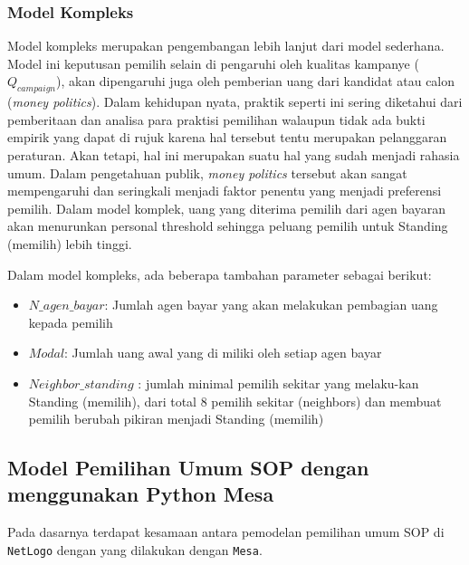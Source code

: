\subsubsection{Model Kompleks}

Model kompleks merupakan pengembangan lebih lanjut dari model sederhana. Model ini keputusan pemilih selain di pengaruhi oleh kualitas kampanye ($Q_{campaign}$), akan dipengaruhi juga oleh pemberian uang dari kandidat atau calon (\textit{money politics}). Dalam kehidupan nyata, praktik seperti ini sering diketahui dari pemberitaan dan analisa para praktisi pemilihan walaupun tidak ada bukti empirik yang dapat di rujuk karena hal tersebut tentu merupakan pelanggaran peraturan. Akan tetapi, hal ini merupakan suatu hal yang sudah menjadi rahasia umum. Dalam pengetahuan publik, \textit{money politics} tersebut akan sangat mempengaruhi dan seringkali menjadi faktor penentu yang menjadi preferensi pemilih. Dalam model komplek, uang yang diterima pemilih dari agen bayaran akan menurunkan personal threshold sehingga peluang pemilih untuk Standing (memilih) lebih tinggi.

Dalam model kompleks, ada beberapa tambahan parameter sebagai berikut:

\begin{itemize}
\item $N\_agen\_bayar$: Jumlah agen bayar yang akan melakukan pembagian uang kepada pemilih

\item $Modal$: Jumlah uang awal yang di miliki oleh setiap agen bayar

\item $Neighbor\_standing$ : jumlah minimal pemilih sekitar yang melaku-kan Standing (memilih), dari total 8 pemilih sekitar (neighbors) dan membuat pemilih berubah pikiran menjadi Standing (memilih)
\end{itemize}

\subsection{Model Pemilihan Umum SOP dengan menggunakan Python Mesa}

Pada dasarnya terdapat kesamaan antara pemodelan pemilihan umum SOP di \texttt{NetLogo} dengan yang dilakukan dengan \texttt{Mesa}.
